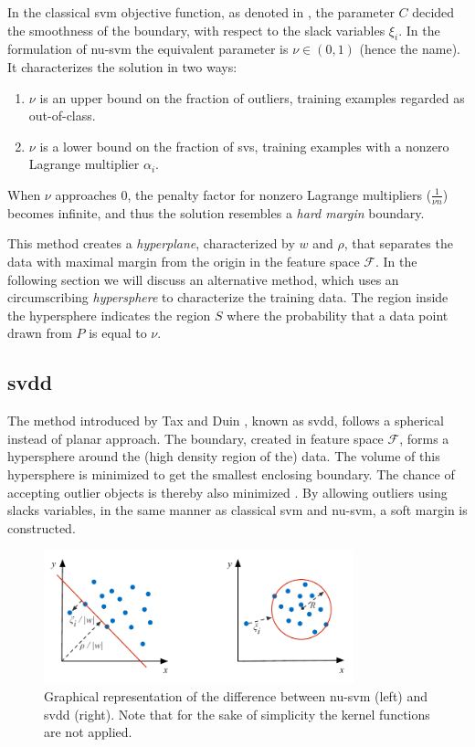 In the classical \gls{svm} objective function, as denoted in , the parameter $C$ decided the smoothness of the boundary, with respect to the slack variables $\xi_i$.
In the formulation of \gls{nu-svm} the equivalent parameter is $\nu \in (0,1)$ (hence the name).
It characterizes the solution in two ways:
\begin{enumerate}
  \item $\nu$ is an upper bound on the fraction of outliers, \ie training examples regarded as out-of-class.
  \item $\nu$ is a lower bound on the fraction of \glspl{sv}, \ie training examples with a nonzero Lagrange multiplier $\alpha_i$.
\end{enumerate}
When $\nu$ approaches $0$, the penalty factor for nonzero Lagrange multipliers ($\frac{1}{\nu n}$) becomes infinite, and thus the solution resembles a \emph{hard margin} boundary.

This method creates a \emph{hyperplane}, characterized by $w$ and $\rho$, that separates the data with maximal margin from the origin in the feature space $\mathcal{F}$.
In the following section we will discuss an alternative method, which uses an circumscribing \emph{hypersphere} to characterize the training data.
The region inside the hypersphere indicates the region $S$ where the probability that a data point drawn from $P$ is equal to $\nu$.



\subsection{\acrlong{svdd}}\label{subsec:oc-svm-svdd}
The method introduced by Tax and Duin \cite{tax1999support}, known as \acrlong{svdd}, follows a spherical instead of planar approach.
The boundary, created in feature space $\mathcal{F}$, forms a hypersphere around the (high density region of the) data.
The volume of this hypersphere is minimized to get the smallest enclosing boundary.
The chance of accepting outlier objects is thereby also minimized \cite{tax2003online}.
By allowing outliers using slacks variables, in the same manner as classical \gls{svm} and \gls{nu-svm}, a soft margin is constructed.

\begin{figure}
  \centering
    \includegraphics[width=0.8\textwidth,keepaspectratio]{./Figures/chapter3/nu-vs-svdd.pdf}
  \caption[Difference \gls{nu-svm} and \gls{svdd}]{Graphical representation of the difference between \gls{nu-svm} (left) and \gls{svdd} (right). Note that for the sake of simplicity the kernel functions are not applied.}
  \label{fig:nu-vs-svdd}
\end{figure}

